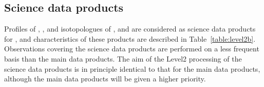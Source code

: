 \subsection{Science data products}
Profiles of , ,  and isotopologues of , and 
are considered as science data products for \smr, and
characteristics of these products are described in Table~\ref{table:level2b}.
Observations covering the science data products are performed on a less 
frequent basis than the main data products. The aim of the
Level2 processing of the science data products is in principle
identical to that for the main data products, although
the main data products will be given a higher priority.





